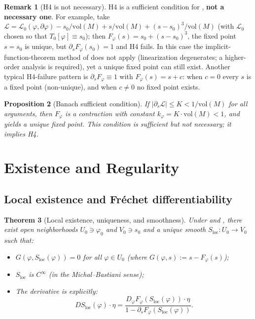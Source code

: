 \documentclass[12pt,letterpaper]{article}
\newtheorem{theorem}{Theorem}[section]
\newtheorem{proposition}[theorem]{Proposition}
\theoremstyle{definition}
\newtheorem{remark}[theorem]{Remark}
\newcommand{\mL}{\mathcal{L}}
\newcommand{\vol}{\mathrm{vol}}
\begin{document}
\begin{remark}[H4 is not necessary]
\label{rem:h4-not-necessary}
H4 is a sufficient condition for , \textbf{not a necessary one}. For example, take $\mL = \mL_0(\varphi, \partial\varphi) - s_0/\vol(M) + s/\vol(M) + (s - s_0)^3/\vol(M)$ (with $\mL_0$ chosen so that $T_0[\varphi] \equiv s_0$); then $F_\varphi(s) = s_0 + (s - s_0)^3$, the fixed point $s = s_0$ is unique, but $\partial_s F_\varphi(s_0) = 1$ and H4 fails. In this case the implicit-function-theorem method of  does not apply (linearization degenerates; a higher-order analysis is required), yet a unique fixed point can still exist. Another typical H4-failure pattern is $\partial_s F_\varphi \equiv 1$ with $F_\varphi(s) = s + c$: when $c = 0$ every $s$ is a fixed point (non-unique), and when $c \neq 0$ no fixed point exists.
\end{remark}

\begin{proposition}[Banach sufficient condition]
\label{prop:banach-suff}
If $|\partial_s \mL| \leq K < 1/\vol(M)$ for all arguments, then $F_\varphi$ is a contraction with constant $k_\varphi = K \cdot \vol(M) < 1$, and  yields a unique fixed point. This condition is sufficient but not necessary; it implies H4.
\end{proposition}

\section{Existence and Regularity}
\label{sec:existence}

\subsection{Local existence and Fr\'echet differentiability}

\begin{theorem}[Local existence, uniqueness, and smoothness]
\label{thm:p3}
Under  and , there exist open neighborhoods $U_0 \ni \varphi_0$ and $V_0 \ni s_0$ and a unique smooth $S_{\mathrm{loc}}: U_0 \to V_0$ such that:
\begin{itemize}
\item[(C1)] $G(\varphi, S_{\mathrm{loc}}(\varphi)) = 0$ for all $\varphi \in U_0$ (where $G(\varphi, s) := s - F_\varphi(s)$);
\item[(C2)] $S_{\mathrm{loc}}$ is $C^\infty$ (in the Michal--Bastiani sense);
\item[(C3)] The derivative is explicitly:
\begin{equation}
DS_{\mathrm{loc}}(\varphi) \cdot \eta = \frac{D_\varphi F_\varphi(S_{\mathrm{loc}}(\varphi)) \cdot \eta}{1 - \partial_s F_\varphi(S_{\mathrm{loc}}(\varphi))}.
\label{eq:explicit-deriv}
\end{equation}
\end{itemize}
\end{theorem}
\end{document}
